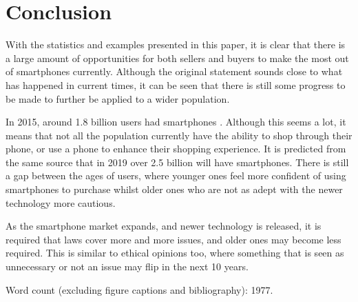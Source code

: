 \section{Conclusion}
With the statistics and examples presented in this paper, it is clear that there is a large amount of opportunities for both sellers and buyers to make the most out of smartphones currently. Although the original statement sounds close to what has happened in current times, it can be seen that there is still some progress to be made to further be applied to a wider population. \par
In 2015, around 1.8 billion users had smartphones \cite{population}. Although this seems a lot, it means that not all the population currently have the ability to shop through their phone, or use a phone to enhance their shopping experience. It is predicted from the same source that in 2019 over 2.5 billion will have smartphones. There is still a gap between the ages of users, where younger ones feel more confident of using smartphones to purchase whilst older ones who are not as adept with the newer technology more cautious. \par
As the smartphone market expands, and newer technology is released, it is required that laws cover more and more issues, and older ones may become less required. This is similar to ethical opinions too, where something that is seen as unnecessary or not an issue may flip in the next 10 years.

Word count (excluding figure captions and bibliography): 1977.

